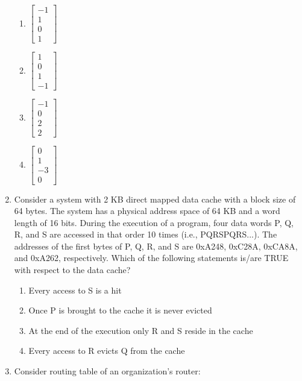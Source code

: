 \begin{enumerate}
\begin{enumerate}
\item $\begin{bmatrix}-1\\1\\0\\1\end{bmatrix}$
\item $\begin{bmatrix}1\\0\\1\\-1\end{bmatrix}$
\item $\begin{bmatrix}-1\\0\\2\\2\end{bmatrix}$
\item $\begin{bmatrix}0\\1\\-3\\0\end{bmatrix}$
\end{enumerate}

\hfill{}

\item Consider a system with 2 KB direct mapped data cache with a block size of 64 bytes. The system has a physical address space of 64 KB and a word length of 16 bits. During the execution of a program, four data words P, Q, R, and S are accessed in that order 10 times (i.e., PQRSPQRS...). The addresses of the first bytes of P, Q, R, and S are 0xA248, 0xC28A, 0xCA8A, and 0xA262, respectively. Which of the following statements is/are TRUE with respect to the data cache?  

\begin{enumerate}
\item Every access to S is a hit
\item Once P is brought to the cache it is never evicted
\item At the end of the execution only R and S reside in the cache
\item Every access to R evicts Q from the cache
\end{enumerate}

\hfill{}

\item Consider routing table of an organization’s router:  


\end{enumerate}
